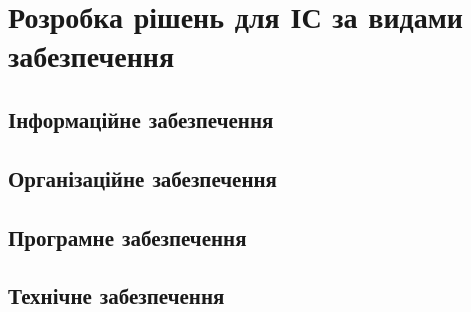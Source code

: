 \chapter{Розробка рішень для ІС за видами забезпечення} 
\label{chap:third}

\section{Інформаційне забезпечення}


\section{Організаційне забезпечення}


\section{Програмне забезпечення}

\section{Технічне забезпечення}